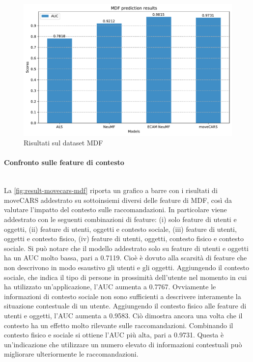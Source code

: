 \documentclass[12pt,italian]{report}
\newcommand{\myparagraph}[1]{\paragraph{#1}\mbox{}\\} %
\begin{document}
\begin{figure}
  \centering
  \includegraphics[width=\linewidth]{immagini/mdf_test_results.pdf}
  \caption{Risultati sul dataset MDF}
  \label{fig:result-mdf}
\end{figure}

\myparagraph{Confronto sulle feature di contesto}
La \autoref{fig:result-movecars-mdf} riporta un grafico a barre con i risultati di moveCARS addestrato su sottoinsiemi diversi delle feature di MDF, così da valutare l'impatto del contesto sulle raccomandazioni. In particolare viene addestrato con le seguenti combinazioni di feature: (i) solo feature di utenti e oggetti, (ii) feature di utenti, oggetti e contesto sociale, (iii) feature di utenti, oggetti e contesto fisico, (iv) feature di utenti, oggetti, contesto fisico e contesto sociale. Si può notare che il modello addestrato solo su feature di utenti e oggetti ha un AUC molto bassa, pari a 0.7119. Cioè è dovuto alla scarsità di feature che non descrivono in modo esaustivo gli utenti e gli oggetti. Aggiungendo il contesto sociale, che indica il tipo di persone in prossimità dell'utente nel momento in cui ha utilizzato un'applicazione, l'AUC aumenta a 0.7767. Ovviamente le informazioni di contesto sociale non sono sufficienti a descrivere interamente la situazione contestuale di un utente. Aggiungendo il contesto fisico alle feature di utenti e oggetti, l'AUC aumenta a 0.9583. Ciò dimostra ancora una volta che il contesto ha un effetto molto rilevante sulle raccomandazioni. Combinando il contesto fisico e sociale si ottiene l'AUC più alta, pari a 0.9731. Questa è un'indicazione che utilizzare un numero elevato di informazioni contestuali può migliorare ulteriormente le raccomandazioni.
\end{document}
